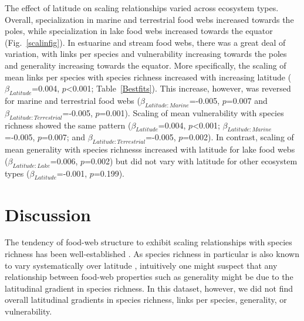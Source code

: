\documentclass[12pt]{article}
\begin{document}
The effect of latitude on scaling relationships varied across ecosystem types.
Overall, specialization in marine and terrestrial food webs increased towards the poles, 
while specialization in lake food webs increased towards the equator (Fig.~\ref{scalinfig}). 
In estuarine and stream food webs, there was a great deal of variation, with links per species
and vulnerability increasing towards the poles and generality increasing towards the equator.
More specifically, the scaling of mean links per species with species richness increased with
increasing latitude ($\beta_{Latitude}$=0.004, $p$\textless0.001; Table~\ref{Bestfits}). This
increase, however, was reversed for marine and terrestrial food webs
($\beta_{Latitude:Marine}$=-0.005, $p$=0.007 and
$\beta_{Latitude:Terrestrial}$=-0.005, $p$=0.001). Scaling of mean vulnerability with
species richness showed the same pattern ($\beta_{Latitude}$=0.004, $p$\textless0.001;
$\beta_{Latitude:Marine}$=-0.005, $p$=0.007; and $\beta_{Latitude:Terrestrial}$=-0.005, $p$=0.002).
In contrast, scaling of mean generality with species richnesss increased with latitude 
for lake food webs ($\beta_{Latitude:Lake}$=0.006, $p$=0.002) but did not vary with latitude for
other ecosystem types ($\beta_{Latitude}$=-0.001, $p$=0.199).

\section*{Discussion}

The tendency of food-web structure to exhibit scaling relationships with
species richness has been well-established \citep{Dunne2004,Riede2010}. As
species richness in particular is also known to vary systematically over
latitude \citep{}, intuitively one might suspect that any relationship
between food-web properties such as generality might be due to the latitudinal
gradient in species richness. In this dataset, however, we did not find
overall latitudinal gradients in species richness, links per species, 
generality, or vulnerability. 
\end{document}
